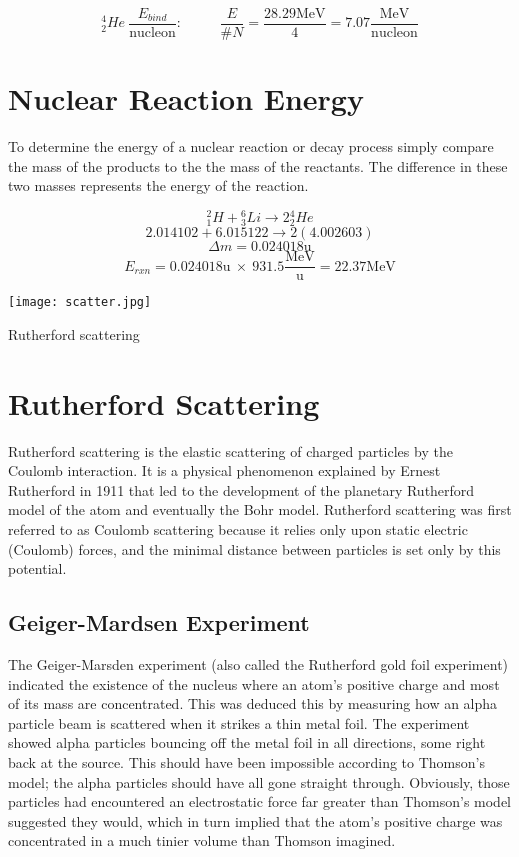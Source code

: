 $${}_{2}^{4}He\ \frac{E_{bind}}{\text{nucleon}}:\ \hspace{1cm}\frac{E}{\#N}=\frac{28.29\text{MeV}}{4}=7.07 \frac{\text{MeV}}{\text{nucleon}}$$

\section{Nuclear Reaction Energy}
To determine the energy of a nuclear reaction or decay process simply compare the mass of the products to the the mass of the reactants.  The difference in these two masses represents the energy of the reaction.

$${}_{1}^{2}H +{}_{3}^{6}Li\longrightarrow 2{}_{2}^{4}He $$
$$2.014102 +6.015122\longrightarrow 2(4.002603) $$
$$ \Delta m = 0.024018 \text{u}$$
$$E_{rxn}=0.024018 \text{u} \ \times \ 931.5\frac{\text{MeV}}{\text{u}}=22.37\text{MeV}$$


\begin{marginfigure}[60pt]
  \texttt{[image: scatter.jpg]}
  \caption{Rutherford scattering}
  \label{fig:fig}
\end{marginfigure}

\section{Rutherford Scattering}
Rutherford scattering is the elastic scattering of charged particles by the Coulomb interaction. It is a physical phenomenon explained by Ernest Rutherford in 1911 that led to the development of the planetary Rutherford model of the atom and eventually the Bohr model.  Rutherford scattering was first referred to as Coulomb scattering because it relies only upon static electric (Coulomb) forces, and the minimal distance between particles is set only by this potential.

\subsection{Geiger-Mardsen Experiment}
The Geiger-Marsden experiment (also called the Rutherford gold foil experiment) indicated the existence of the nucleus where an atom's positive charge and most of its mass are concentrated. This was deduced this by measuring how an alpha particle beam is scattered when it strikes a thin metal foil.  
The experiment showed alpha particles bouncing off the metal foil in all directions, some right back at the source. This should have been impossible according to Thomson's model; the alpha particles should have all gone straight through. Obviously, those particles had encountered an electrostatic force far greater than Thomson's model suggested they would, which in turn implied that the atom's positive charge was concentrated in a much tinier volume than Thomson imagined.



